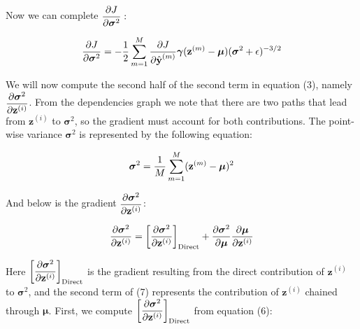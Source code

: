 \documentclass{article}
\begin{document}
\begin{multicols*}{2}
Now we can complete $\begin{aligned}
    {\partial J \over \partial \boldsymbol{\sigma}^2}:
\end{aligned}$

\begin{equation}
    {\partial J \over \partial \boldsymbol{\sigma}^2} = -{1\over 2}
    \sum_{m = 1}^M {\partial J \over \partial \hat{\textbf{y}}^{(m)}} 
    \boldsymbol{\gamma}
    (\textbf{z}^{(m)} - \boldsymbol{\mu}) (\boldsymbol{\sigma}^2 + \epsilon)^{-3/2}
\end{equation}

We will now compute the second half of the second term in equation (3), 
namely $\begin{aligned}
    {\partial \boldsymbol{\sigma}^2 \over \partial \textbf{z}^{(i)}}
\end{aligned}$. From the dependencies graph we 
note that there are two paths that lead from $\textbf{z}^{(i)}$ to 
$\boldsymbol{\sigma}^2$, so the gradient must account for both contributions.
The point-wise variance $\boldsymbol{\sigma}^2$ is 
represented by the following equation:

\begin{equation}
    \boldsymbol{\sigma}^2 = {1\over M} 
    \sum_{m = 1}^M (\textbf{z}^{(m)} - \boldsymbol{\mu})^2
\end{equation}

And below is the gradient $\begin{aligned}
    {\partial \boldsymbol{\sigma}^2 \over \partial \textbf{z}^{(i)}}
\end{aligned}$:

\begin{equation}
    {\partial \boldsymbol{\sigma}^2 \over \partial \textbf{z}^{(i)}} = 
    \bigg[{\partial \boldsymbol{\sigma}^2 \over \partial \textbf{z}^{(i)}} \bigg]_{\text{Direct}}
    + {\partial \boldsymbol{\sigma}^2 \over \partial \boldsymbol{\mu}}
    {\partial \boldsymbol{\mu} \over \partial \textbf{z}^{(i)}}
\end{equation}

Here $\begin{aligned}
    \bigg[{\partial \boldsymbol{\sigma}^2 \over \partial \textbf{z}^{(i)}} \bigg]_{\text{Direct}}
\end{aligned}$ is the gradient resulting from the direct contribution of
$\textbf{z}^{(i)}$ to $\boldsymbol{\sigma}^2$, and the second term of (7) represents
the contribution of $\textbf{z}^{(i)}$ chained through $\boldsymbol{\mu}$.
First, we compute $\begin{aligned}
    \bigg[{\partial \boldsymbol{\sigma}^2 \over \partial \textbf{z}^{(i)}} \bigg]_{\text{Direct}}
\end{aligned}$ from equation (6):


\end{multicols*}
\end{document}
